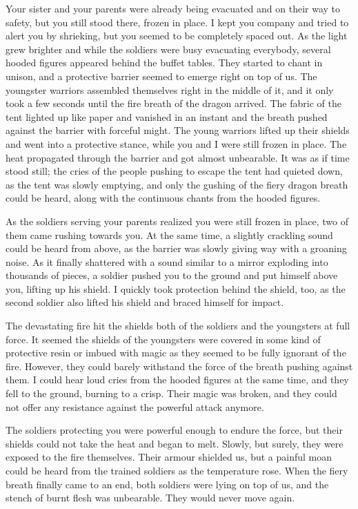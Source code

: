 Your sister and your parents were already being evacuated and on their way to safety, but you still stood there, frozen in place. I kept you company and tried to alert you by shrieking, but you seemed to be completely spaced out. As the light grew brighter and while the soldiers were busy evacuating everybody, several hooded figures appeared behind the buffet tables. They started to chant in unison, and a protective barrier seemed to emerge right on top of us. The youngster warriors assembled themselves right in the middle of it, and it only took a few seconds until the fire breath of the dragon arrived. The fabric of the tent lighted up like paper and vanished in an instant and the breath pushed against the barrier with forceful might. The young warriors lifted up their shields and went into a protective stance, while you and I were still frozen in place. The heat propagated through the barrier and got almost unbearable. It was as if time stood still; the cries of the people pushing to escape the tent had quieted down, as the tent was slowly emptying, and only the gushing of the fiery dragon breath could be heard, along with the continuous chants from the hooded figures.

As the soldiers serving your parents realized you were still frozen in place, two of them came rushing towards you. At the same time, a slightly crackling sound could be heard from above, as the barrier was slowly giving way with a groaning noise. As it finally shattered with a sound similar to a mirror exploding into thousands of pieces, a soldier pushed you to the ground and put himself above you, lifting up his shield. I quickly took protection behind the shield, too, as the second soldier also lifted his shield and braced himself for impact.

The devastating fire hit the shields both of the soldiers and the youngsters at full force. It seemed the shields of the youngsters were covered in some kind of protective resin or imbued with magic as they seemed to be fully ignorant of the fire. However, they could barely withstand the force of the breath pushing against them. I could hear loud cries from the hooded figures at the same time, and they fell to the ground, burning to a crisp. Their magic was broken, and they could not offer any resistance against the powerful attack anymore.

The soldiers protecting you were powerful enough to endure the force, but their shields could not take the heat and began to melt. Slowly, but surely, they were exposed to the fire themselves. Their armour shielded us, but a painful moan could be heard from the trained soldiers as the temperature rose. When the fiery breath finally came to an end, both soldiers were lying on top of us, and the stench of burnt flesh was unbearable. They would never move again.

